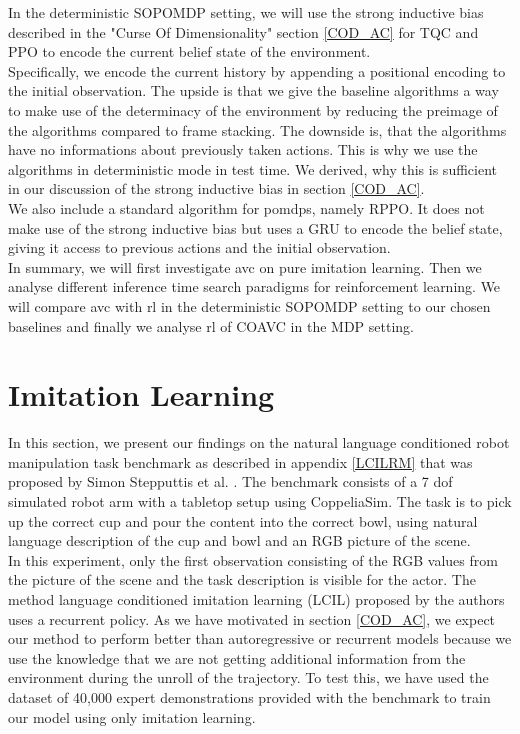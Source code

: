 In the deterministic SOPOMDP setting, we will use the strong inductive bias described in the "Curse Of Dimensionality" 
section \ref{COD_AC} for TQC and PPO to encode the current belief state of the environment. \\
Specifically, we encode the current history by appending a positional encoding to the initial observation. The upside is that we give 
the baseline algorithms a way to make use of the determinacy of the environment by reducing the preimage of the algorithms compared to 
frame stacking. The downside is, that the algorithms have no informations about previously taken actions. This is why we use the 
algorithms in deterministic mode in test time. We derived, why this is sufficient in our discussion of the strong inductive bias in 
section \ref{COD_AC}.\\

We also include a standard algorithm for \ac{pomdp}s, namely RPPO. It does not make use of the strong inductive bias but uses a GRU 
to encode the belief state, giving it access to previous actions and the initial observation.\\


In summary, we will first investigate \ac{avc} on pure imitation learning. Then we analyse different inference time search 
paradigms for reinforcement learning. We will compare \ac{avc} with \ac{rl} in the deterministic SOPOMDP setting to our chosen baselines and finally we analyse 
\ac{rl} of COAVC in the MDP setting.


\section{Imitation Learning}
\label{sec:exp_imi_lr}
In this section, we present our findings on the natural language conditioned robot manipulation task benchmark as described in appendix \ref{LCILRM} that was proposed by 
Simon Stepputtis et al. \cite{stepputtis2020languageconditioned}. The benchmark consists of a 7 dof simulated robot arm with a 
tabletop setup using CoppeliaSim. The task is to pick 
up the correct cup and pour the content into the correct bowl, using natural language description of the cup and bowl and an RGB 
picture of the scene.\\

In this experiment, only the first observation consisting of the RGB values from the picture of the 
scene and the task description is visible for the actor. The method language conditioned imitation learning (LCIL)
proposed by the authors uses a recurrent policy. As we have motivated in section \ref{COD_AC}, we expect our method to perform better than autoregressive or recurrent 
models because we use the knowledge that we are not getting additional information from the environment during the unroll of the trajectory. 
To test this, we have used the dataset of 40,000 expert demonstrations provided with the benchmark to train our model using only imitation learning.\\

